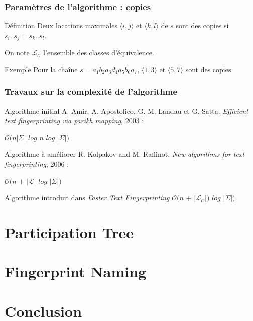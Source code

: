 \documentclass[10pt]{beamer}
\begin{document}
\begin{frame}
	\frametitle{Paramètres de l'algorithme : copies}
	
	\begin{block}{Définition}
		Deux locations maximales $\langle i,j \rangle$ et $\langle k,l \rangle$ de $s$ sont des copies si $s_{i}..s_{j} = s_{k}..s_{l}$.\newline
		
		On note $\mathcal{L}_{\mathcal{C}}$ l'ensemble des classes d'équivalence.
	\end{block}
	
	\begin{block}{Exemple}
		Pour la chaîne $s = a_{1} b_{2} a_{3} d_{4} a_{5} b_{6} a_{7}$, $\langle1,3\rangle$ et $\langle5,7\rangle$ sont des copies.
	\end{block}
\end{frame}

\begin{frame}
	\frametitle{Travaux sur la complexité de l'algorithme}
	
	\begin{block}{Algorithme initial}
		A. Amir, A. Apostolico, G. M. Landau et G. Satta. \textit{Efficient text fingerprinting via parikh mapping}, 2003 :\newline
		
		$\mathcal{O}(n|\Sigma|$ $log$ $n$ $log$ $|\Sigma|)$
	\end{block}
	
	\begin{block}{Algorithme à améliorer}
		R. Kolpakov and M. Raffinot. \textit{New algorithms for text fingerprinting}, 2006 : \newline
		
		$\mathcal{O}(n$ $+$ $|\mathcal{L}|$ $log$ $|\Sigma|)$
	\end{block}
	
	\begin{block}{Algorithme introduit dans \textit{Faster Text Fingerprinting}}
		$\mathcal{O}(n$ $+$ $|\mathcal{L}_{\mathcal{C}}|)$ $log$ $|\Sigma|)$
	\end{block}

\end{frame}


\section{Participation Tree}

\section{Fingerprint Naming}

\section{Conclusion}
\end{document}
